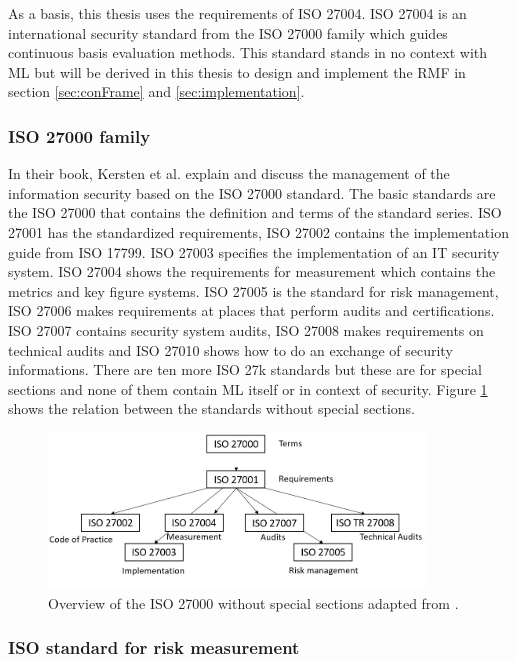 As a basis, this thesis uses the requirements of ISO 27004. ISO 27004 is an international security standard from the ISO 27000 family which guides continuous basis evaluation methods. This standard stands in no context with ML but will be derived in this thesis to design and implement the RMF in section \ref{sec:conFrame} and \ref{sec:implementation}.

\subsubsection*{ISO 27000 family}

In their book, Kersten et al. \cite{kersten_reuter_schroeder_wolfenstetter_2013} explain and discuss the management of the information security based on the ISO 27000 standard. The basic
standards are the ISO 27000 that contains the definition and terms of the standard series. ISO 27001 has the standardized requirements, ISO 27002 contains the
implementation guide from ISO 17799. ISO 27003 specifies the implementation of an IT security system. ISO 27004 shows the requirements for measurement which contains the metrics and key
figure systems. ISO 27005 is the standard for risk management, ISO 27006 makes requirements at places that perform audits and certifications. ISO 27007 contains security system audits, ISO 27008 makes requirements on technical audits and ISO 27010 shows how to do an exchange of security informations. There are ten more ISO 27k standards but these are for special sections and none of them contain ML itself or in context of security. Figure \ref{fig:standard_relations} shows the relation between the standards without special sections.

\begin{figure}[ht!]
  \centering
  \includegraphics[width=10cm]{pictures/standard_relations.jpg}
  \caption{Overview of the ISO 27000 without special sections adapted from \cite{kersten_reuter_schroeder_wolfenstetter_2013}.}
  \label{fig:standard_relations}
\end{figure}

\subsubsection*{ISO standard for risk measurement}

